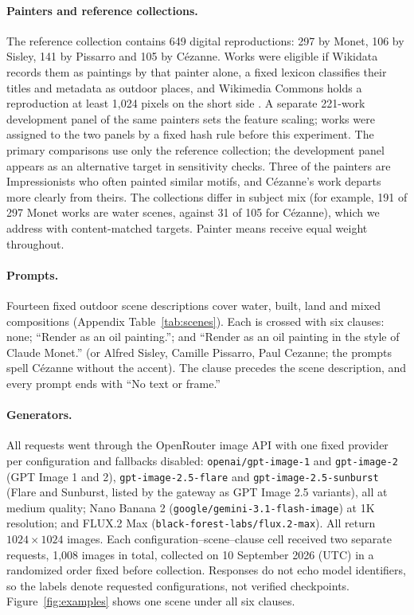 \documentclass[10pt]{article}
\begin{document}
\paragraph{Painters and reference collections.}
The reference collection contains 649 digital reproductions: 297 by Monet, 106 by Sisley, 141 by
Pissarro and 105 by C\'ezanne. Works were eligible if Wikidata records them as paintings by that
painter alone, a fixed lexicon classifies their titles and metadata as outdoor places, and
Wikimedia Commons holds a reproduction at least 1,024 pixels on the short side
\citep{wikimediacommons,vrandecic2014wikidata}. A separate 221-work development panel of the same
painters sets the feature scaling; works were assigned to the two panels by a fixed hash rule
before this experiment. The primary comparisons use only the reference collection; the
development panel appears as an alternative target in sensitivity checks. Three of the painters
are Impressionists who often painted similar motifs, and C\'ezanne's work departs more clearly
from theirs. The collections differ in subject mix (for example, 191 of 297 Monet works are
water scenes, against 31 of 105 for C\'ezanne), which we address with content-matched targets.
Painter means receive equal weight throughout.

\paragraph{Prompts.}
Fourteen fixed outdoor scene descriptions cover water, built, land and mixed compositions
(Appendix Table~\ref{tab:scenes}). Each is crossed with six clauses: none; ``Render as an oil
painting.''; and ``Render as an oil painting in the style of Claude Monet.'' (or Alfred Sisley,
Camille Pissarro, Paul Cezanne; the prompts spell C\'ezanne without the accent). The clause
precedes the scene description, and every prompt ends with ``No text or frame.''

\paragraph{Generators.}
All requests went through the OpenRouter image API with one fixed provider per configuration and
fallbacks disabled: \texttt{openai/gpt-image-1} and \texttt{gpt-image-2} (GPT Image 1 and 2),
\texttt{gpt-image-2.5-flare} and \texttt{gpt-image-2.5-sunburst} (Flare and Sunburst, listed by
the gateway as GPT Image 2.5 variants), all at medium quality; Nano Banana 2
(\texttt{google/gemini-3.1-flash-image}) at 1K resolution; and FLUX.2 Max
(\texttt{black-forest-labs/flux.2-max}). All return $1024\times1024$ images. Each
configuration--scene--clause cell received two separate requests, 1,008 images in total,
collected on 10 September 2026 (UTC) in a randomized order fixed before collection. Responses do
not echo model identifiers, so the labels denote requested configurations, not verified
checkpoints. Figure~\ref{fig:examples} shows one scene under all six clauses.
\end{document}
